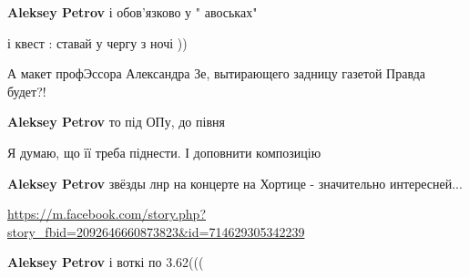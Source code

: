 \begin{itemize}
\begin{itemize}
\textbf{Aleksey Petrov} і обов'язково у " авоськах"

 
і квест : ставай у чергу з ночі ))

 
А макет профЭссора Александра Зе, вытирающего задницу газетой Правда будет?!

 
\textbf{Aleksey Petrov} то під ОПу, до півня

 
Я думаю, що її треба піднести. І доповнити композицію

 
\textbf{Aleksey Petrov} звёзды лнр на концерте на Хортице - значительно интересней... 

\url{https://m.facebook.com/story.php?story_fbid=2092646660873823&id=714629305342239}


 
\textbf{Aleksey Petrov} і воткі по 3.62(((
\end{itemize}


\end{itemize}
